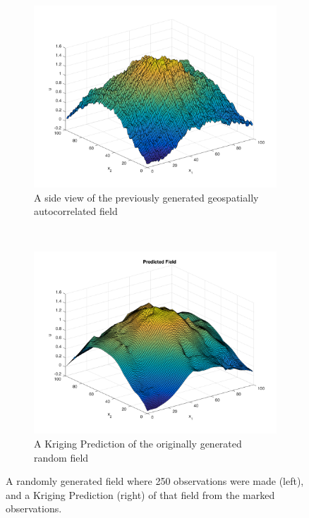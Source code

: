 \documentclass[11pt]{ucthesis}
\begin{document}
\begin{figure}[ht!]
    \centering
    \begin{subfigure}[t]{0.5\textwidth}
        \centering
        \includegraphics[width=\linewidth]{figures/generated_field_side_view.png}
        \captionsetup{skip=0.5\baselineskip, width=0.8\textwidth, size=footnotesize}
        \caption{A side view of the previously generated geospatially autocorrelated field}
        \label{fig:sampled_field}
    \end{subfigure}%
    ~ 
    \begin{subfigure}[t]{0.5\textwidth}
        \centering
        \includegraphics[width=\linewidth]{figures/kriging_side_pred_field.png}
        \captionsetup{skip=0.5\baselineskip, width=0.8\textwidth, size=footnotesize}
        \caption{A Kriging Prediction of the originally generated random field}
        \label{fig:krig_side_field}
    \end{subfigure}
    \captionsetup{skip=0.5\baselineskip,size=footnotesize}
    \caption{A randomly generated field where 250 observations were made (left), and a Kriging Prediction (right) of that field from the marked observations.}
    \label{fig:krig_side_side_by_side}
\end{figure}
\end{document}

